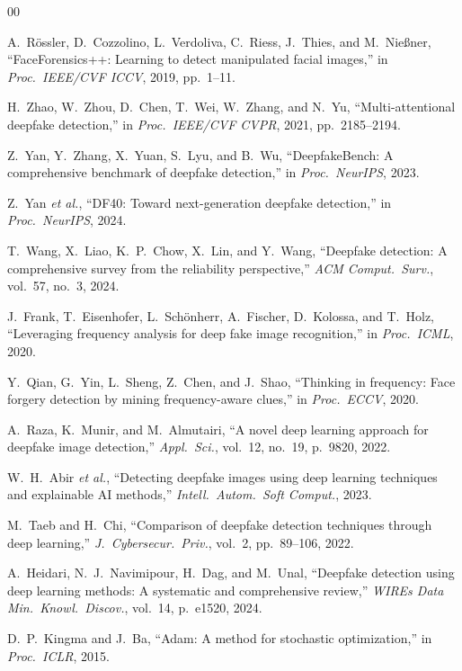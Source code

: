 \documentclass[conference]{IEEEtran}
\begin{document}
\begin{thebibliography}{00}

A.~R\"{o}ssler, D.~Cozzolino, L.~Verdoliva, C.~Riess, J.~Thies, and
M.~Nie{\ss}ner, ``FaceForensics++: Learning to detect manipulated
facial images,'' in \textit{Proc.\ IEEE/CVF ICCV}, 2019, pp.~1--11.

H.~Zhao, W.~Zhou, D.~Chen, T.~Wei, W.~Zhang, and N.~Yu,
``Multi-attentional deepfake detection,'' in \textit{Proc.\ IEEE/CVF
CVPR}, 2021, pp.~2185--2194.

Z.~Yan, Y.~Zhang, X.~Yuan, S.~Lyu, and B.~Wu,
``DeepfakeBench: A comprehensive benchmark of deepfake detection,''
in \textit{Proc.\ NeurIPS}, 2023.

Z.~Yan \textit{et al.}, ``DF40: Toward next-generation deepfake
detection,'' in \textit{Proc.\ NeurIPS}, 2024.

T.~Wang, X.~Liao, K.~P.~Chow, X.~Lin, and Y.~Wang,
``Deepfake detection: A comprehensive survey from the reliability
perspective,'' \textit{ACM Comput.\ Surv.}, vol.~57, no.~3, 2024.

J.~Frank, T.~Eisenhofer, L.~Sch\"{o}nherr, A.~Fischer, D.~Kolossa,
and T.~Holz, ``Leveraging frequency analysis for deep fake image
recognition,'' in \textit{Proc.\ ICML}, 2020.

Y.~Qian, G.~Yin, L.~Sheng, Z.~Chen, and J.~Shao,
``Thinking in frequency: Face forgery detection by mining
frequency-aware clues,'' in \textit{Proc.\ ECCV}, 2020.

A.~Raza, K.~Munir, and M.~Almutairi,
``A novel deep learning approach for deepfake image detection,''
\textit{Appl.\ Sci.}, vol.~12, no.~19, p.~9820, 2022.

W.~H.~Abir \textit{et al.},
``Detecting deepfake images using deep learning techniques and
explainable AI methods,''
\textit{Intell.\ Autom.\ Soft Comput.}, 2023.

M.~Taeb and H.~Chi,
``Comparison of deepfake detection techniques through deep learning,''
\textit{J.\ Cybersecur.\ Priv.}, vol.~2, pp.~89--106, 2022.

A.~Heidari, N.~J.~Navimipour, H.~Dag, and M.~Unal,
``Deepfake detection using deep learning methods: A systematic and
comprehensive review,''
\textit{WIREs Data Min.\ Knowl.\ Discov.}, vol.~14, p.~e1520, 2024.

D.~P.~Kingma and J.~Ba,
``Adam: A method for stochastic optimization,''
in \textit{Proc.\ ICLR}, 2015.

\end{thebibliography}
\end{document}
